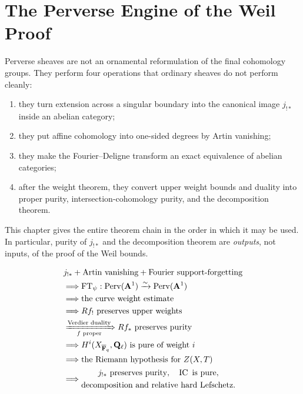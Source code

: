 \chapter{The Perverse Engine of the Weil Proof}
\label{chap:perverse-engine}
\providecommand{\pr}{\operatorname{pr}}
\providecommand{\FT}{\operatorname{FT}}

Perverse sheaves are not an ornamental reformulation of the final
cohomology groups.  They perform four operations that ordinary sheaves do
not perform cleanly:
\begin{enumerate}
\item they turn extension across a singular boundary into the canonical
      image \(j_{!*}\) inside an abelian category;
\item they put affine cohomology into one-sided degrees by Artin vanishing;
\item they make the Fourier--Deligne transform an exact equivalence of
      abelian categories;
\item after the weight theorem, they convert upper weight bounds and
      duality into proper purity, intersection-cohomology purity, and the
      decomposition theorem.
\end{enumerate}
This chapter gives the entire theorem chain in the order in which it may be
used.  In particular, purity of \(j_{!*}\) and the decomposition theorem are
\emph{outputs}, not inputs, of the proof of the Weil bounds.

\begin{powerbox}[title={The proof in one display}]
\[
\begin{aligned}
 &j_{!*}+\text{Artin vanishing}
      +\text{Fourier support-forgetting}\\
 &\Longrightarrow
      \FT_\psi:\Perv(\A^1)\xrightarrow{\sim}\Perv(\A^1)\\
 &\Longrightarrow \text{the curve weight estimate}\\
 &\Longrightarrow Rf_!\text{ preserves upper weights}\\
 &\xRightarrow[\ f\text{ proper}\ ]{\text{Verdier duality}}
      Rf_*\text{ preserves purity}\\
 &\Longrightarrow H^i(X_{\Fbar},\Ql)
      \text{ is pure of weight }i\\
 &\Longrightarrow \text{the Riemann hypothesis for }Z(X,T)\\
 &\Longrightarrow
   \begin{gathered}
      j_{!*}\text{ preserves purity},\quad \IC\text{ is pure},\\
      \text{decomposition and relative hard Lefschetz}.
   \end{gathered}
\end{aligned}
\]
\end{powerbox}

